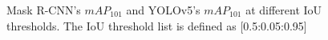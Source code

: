 \begin{figure}[!ht]
    \centering
    \quad
    \caption{Mask R-CNN's $mAP_{101}$ and YOLOv5's $mAP_{101}$ at different IoU thresholds. The IoU threshold list is defined as [0.5:0.05:0.95]} \label{fig:mrcnn_yolov5_map}
\end{figure}

